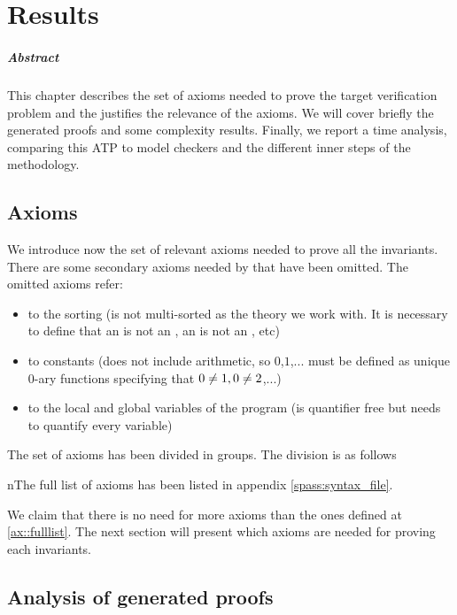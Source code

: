 \chapter{Results\label{chap:results}}

\paragraph{Abstract}

This chapter describes the set of axioms needed to prove the target verification problem and the justifies the relevance of the axioms.
%
We will cover briefly the generated proofs and some complexity results.
%
Finally, we report a time analysis, comparing this \gls{ATP} to model checkers and the different inner steps of the methodology.


\section{Axioms}

We introduce now the set of relevant axioms needed to prove all the invariants.
%
There are some secondary axioms needed by \spass that have been omitted. 
%
The omitted axioms refer: 
%
\begin{itemize}
	\item to the sorting (\spass is not multi-sorted as the theory we work with. It is necessary to define that an \addr is not an \elem, an \elem is not an \addr, etc)
	\item to constants (\spass does not include arithmetic, so $0$,$1$,... must be defined as unique 0-ary functions specifying that $0\not= 1,0\not= 2$,...)
	\item to the local and global variables of the program (\leap is quantifier free but \spass needs to quantify every variable)
\end{itemize}  
%
The set of axioms has been divided in groups. 
%
The division is as follows
		
\label{ax::fulllist}



nThe full list of axioms has been listed in appendix \ref{spass:syntax_file}. 

%

We claim that there is no need for more axioms than the ones defined at \ref{ax::fulllist}. 
%
The next section will present which axioms are needed for proving each invariants.

\section{Analysis of generated proofs}
\label{proof:Preserve}
\label{sec:axiomgraph}


